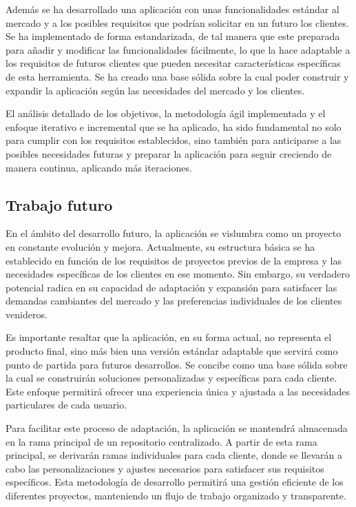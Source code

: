 \documentclass[11pt]{article}
\begin{document}
Además se ha desarrollado una aplicación con unas funcionalidades estándar al mercado y a los posibles requisitos que podrían solicitar en un futuro
los clientes. Se ha implementado de forma estandarizada, de tal manera que este preparada para añadir y modificar las funcionalidades fácilmente, lo que la hace
adaptable a los requisitos de futuros clientes que pueden necesitar características específicas de esta herramienta.
Se ha creado una base sólida sobre la cual poder construir y expandir la aplicación según las necesidades del mercado y los clientes.

El análisis detallado de los objetivos, la metodología ágil implementada y el enfoque iterativo e incremental que se ha aplicado,
ha sido fundamental no solo para cumplir con los requisitos establecidos, sino también para anticiparse a las posibles necesidades futuras y
preparar la aplicación para seguir creciendo de manera continua, aplicando más iteraciones.

\subsection{Trabajo futuro}
En el ámbito del desarrollo futuro, la aplicación se vislumbra como un proyecto en constante evolución y mejora. Actualmente, su estructura básica se ha 
establecido en función de los requisitos de proyectos previos de la empresa y las necesidades específicas de los clientes en ese momento. Sin embargo, su 
verdadero potencial radica en su capacidad de adaptación y expansión para satisfacer las demandas cambiantes del mercado y las preferencias individuales de los 
clientes venideros.

Es importante resaltar que la aplicación, en su forma actual, no representa el producto final, sino más bien una versión estándar adaptable que servirá como punto
de partida para futuros desarrollos. Se concibe como una base sólida sobre la cual se construirán soluciones personalizadas y específicas para cada cliente. Este enfoque
permitirá ofrecer una experiencia única y ajustada a las necesidades particulares de cada usuario.

Para facilitar este proceso de adaptación, la aplicación se mantendrá almacenada en la rama principal de un repositorio centralizado. A partir de esta rama principal,
se derivarán ramas individuales para cada cliente, donde se llevarán a cabo las personalizaciones y ajustes necesarios para satisfacer sus requisitos específicos.
Esta metodología de desarrollo permitirá una gestión eficiente de los diferentes proyectos, manteniendo un flujo de trabajo organizado y transparente.
\end{document}
